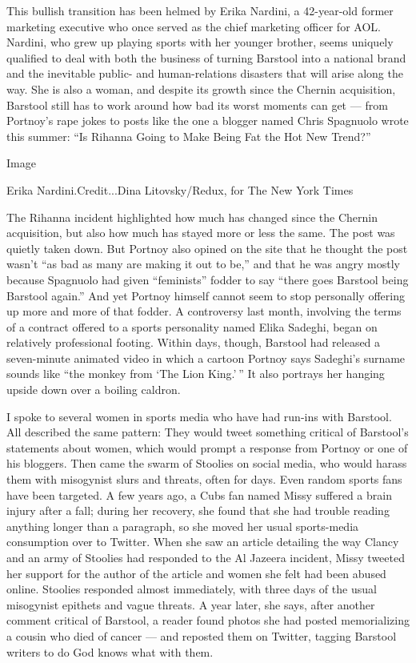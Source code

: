 This bullish transition has been helmed by Erika Nardini, a 42-year-old
former marketing executive who once served as the chief marketing
officer for AOL. Nardini, who grew up playing sports with her younger
brother, seems uniquely qualified to deal with both the business of
turning Barstool into a national brand and the inevitable public- and
human-relations disasters that will arise along the way. She is also a
woman, and despite its growth since the Chernin acquisition, Barstool
still has to work around how bad its worst moments can get --- from
Portnoy's rape jokes to posts like the one a blogger named Chris
Spagnuolo wrote this summer: ``Is Rihanna Going to Make Being Fat the
Hot New Trend?''

Image

Erika Nardini.Credit...Dina Litovsky/Redux, for The New York Times

The Rihanna incident highlighted how much has changed since the Chernin
acquisition, but also how much has stayed more or less the same. The
post was quietly taken down. But Portnoy also opined on the site that he
thought the post wasn't ``as bad as many are making it out to be,'' and
that he was angry mostly because Spagnuolo had given ``feminists''
fodder to say ``there goes Barstool being Barstool again.'' And yet
Portnoy himself cannot seem to stop personally offering up more and more
of that fodder. A controversy last month, involving the terms of a
contract offered to a sports personality named Elika Sadeghi, began on
relatively professional footing. Within days, though, Barstool had
released a seven-minute animated video in which a cartoon Portnoy says
Sadeghi's surname sounds like ``the monkey from `The Lion King.' '' It
also portrays her hanging upside down over a boiling caldron.

I spoke to several women in sports media who have had run-ins with
Barstool. All described the same pattern: They would tweet something
critical of Barstool's statements about women, which would prompt a
response from Portnoy or one of his bloggers. Then came the swarm of
Stoolies on social media, who would harass them with misogynist slurs
and threats, often for days. Even random sports fans have been targeted.
A few years ago, a Cubs fan named Missy suffered a brain injury after a
fall; during her recovery, she found that she had trouble reading
anything longer than a paragraph, so she moved her usual sports-media
consumption over to Twitter. When she saw an article detailing the way
Clancy and an army of Stoolies had responded to the Al Jazeera incident,
Missy tweeted her support for the author of the article and women she
felt had been abused online. Stoolies responded almost immediately, with
three days of the usual misogynist epithets and vague threats. A year
later, she says, after another comment critical of Barstool, a reader
found photos she had posted memorializing a cousin who died of cancer
--- and reposted them on Twitter, tagging Barstool writers to do God
knows what with them.

